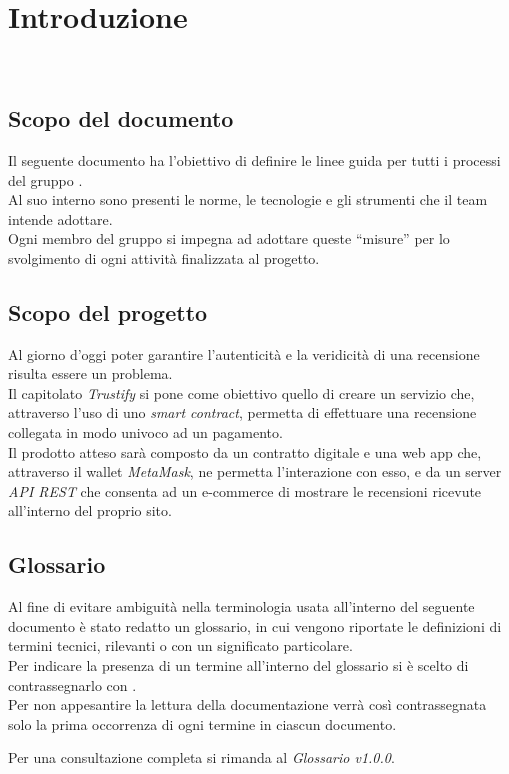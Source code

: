 \section{Introduzione}\
\subsection{Scopo del documento}
Il seguente documento ha l'obiettivo di definire le linee guida per tutti i
processi del gruppo \groupName. \\ Al suo interno sono presenti le norme, le
tecnologie e gli strumenti che il team intende adottare. \\ Ogni membro del
gruppo si impegna ad adottare queste “misure” per lo svolgimento di ogni
attività finalizzata al progetto.

\subsection{Scopo del progetto}
Al giorno d'oggi poter garantire l'autenticità e la veridicità di una
recensione\glo \: risulta essere un problema. \\ Il capitolato \textit{Trustify} si
pone come obiettivo quello di creare un servizio che, attraverso l'uso di uno
\textit{smart contract}\glo \:, permetta di effettuare una recensione collegata in
modo univoco ad un pagamento. \\ Il prodotto atteso sarà composto da un
contratto digitale e una web app che, attraverso il wallet \textit{MetaMask}\glo \:, ne
permetta l'interazione con esso, e da un server \textit{API REST}\glo \: che consenta ad un
e-commerce\glo \: di mostrare le recensioni ricevute all'interno del proprio sito.

\subsection{Glossario}
Al fine di evitare ambiguità nella terminologia usata all'interno del seguente
documento è stato redatto un glossario, in cui vengono riportate le definizioni
di termini tecnici, rilevanti o con un significato particolare. \\ Per indicare
la presenza di un termine all'interno del glossario si è scelto di
contrassegnarlo con \glo .\\ Per non appesantire la lettura della documentazione
verrà così contrassegnata solo la prima occorrenza di ogni termine in ciascun
documento.

Per una consultazione completa si rimanda al \textit{Glossario v1.0.0}.

